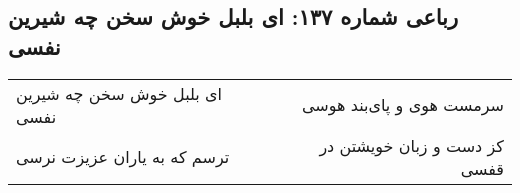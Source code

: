 \begin{center}
\section*{رباعی شماره ۱۳۷: ای بلبل خوش سخن چه شیرین نفسی}
\label{sec:137}
\begin{longtable}{l p{0.5cm} r}
ای بلبل خوش سخن چه شیرین نفسی
&&
سرمست هوی و پای‌بند هوسی
\\
ترسم که به یاران عزیزت نرسی
&&
کز دست و زبان خویشتن در قفسی
\\
\end{longtable}
\end{center}
